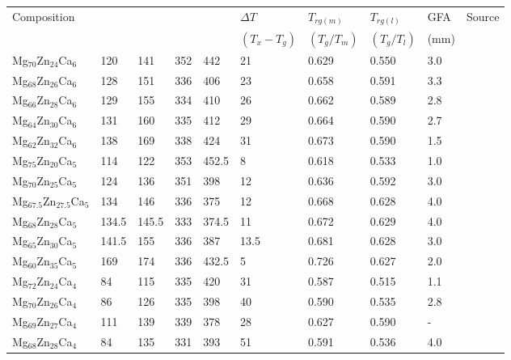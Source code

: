 \documentclass[draft,a4paper,12pt,oneside]{report}%
\begin{document}
\begin{table}[h]
	\centering
	\begin{tabular}{ l l l l l l l l l l }
		\toprule
		Composition & \Tg  & \Tx  & \Tm  & \Tl  & $\Delta T$ & $T_{rg(m)}$ & $T_{rg(l)}$ & GFA & Source \\ 
		& & & & & $(T_{x} - T_{g})$ & $(T_{g}/T_{m})$ & $(T_{g}/T_{l})$ & (mm) & \\ 
		\midrule
		Mg$_{70}$Zn$_{24}$Ca$_{6}$ & 120 & 141 & 352 & 442 & 21 & 0.629 & 0.550 & 3.0 & \cite{Cao2013, Cao2012} \\ 
		Mg$_{68}$Zn$_{26}$Ca$_{6}$ & 128 & 151 & 336 & 406 & 23 & 0.658 & 0.591 & 3.3 & \cite{Cao2013, Cao2012} \\ 
		Mg$_{66}$Zn$_{28}$Ca$_{6}$ & 129 & 155 & 334 & 410 & 26 & 0.662 & 0.589 & 2.8 & \cite{Cao2013, Cao2012} \\ 
		Mg$_{64}$Zn$_{30}$Ca$_{6}$ & 131 & 160 & 335 & 412 & 29 & 0.664 & 0.590 & 2.7 & \cite{Cao2013, Cao2012} \\ 
		Mg$_{62}$Zn$_{32}$Ca$_{6}$ & 138 & 169 & 338 & 424 & 31 & 0.673 & 0.590 & 1.5 & \cite{Cao2013, Cao2012} \\ 
		Mg$_{75}$Zn$_{20}$Ca$_{5}$ & 114 & 122 & 353 & 452.5 & 8 & 0.618 & 0.533 & 1.0 & \cite{Gu2005} \\ 
		Mg$_{70}$Zn$_{25}$Ca$_{5}$ & 124 & 136 & 351 & 398 & 12 & 0.636 & 0.592 & 3.0 & \cite{Gu2005, Zhou2013} \\ 
		Mg$_{67.5}$Zn$_{27.5}$Ca$_{5}$ & 134 & 146 & 336 & 375 & 12 & 0.668 & 0.628 & 4.0 & \cite{Gu2005} \\ 
		Mg$_{68}$Zn$_{28}$Ca$_{5}$ & 134.5 & 145.5 & 333 & 374.5 & 11 & 0.672 & 0.629 & 4.0 & \cite{Gu2005} \\ 
		Mg$_{65}$Zn$_{30}$Ca$_{5}$ & 141.5 & 155 & 336 & 387 & 13.5 & 0.681 & 0.628 & 3.0 & \cite{Gu2005} \\ 
		Mg$_{60}$Zn$_{35}$Ca$_{5}$ & 169 & 174 & 336 & 432.5 & 5 & 0.726 & 0.627 & 2.0 & \cite{Gu2005} \\ 
		Mg$_{72}$Zn$_{24}$Ca$_{4}$ & 84 & 115 & 335 & 420 & 31 & 0.587 & 0.515 & 1.1 & \cite{Cao2013, Cao2012} \\ 
		Mg$_{70}$Zn$_{26}$Ca$_{4}$ & 86 & 126 & 335 & 398 & 40 & 0.590 & 0.535 & 2.8 & \cite{Cao2013, Cao2012} \\ 
		Mg$_{69}$Zn$_{27}$Ca$_{4}$ & 111 & 139 & 339 & 378 & 28 & 0.627 & 0.590 & - & \cite{Wang2013} \\ 
		Mg$_{68}$Zn$_{28}$Ca$_{4}$ & 84 & 135 & 331 & 393 & 51 & 0.591 & 0.536 & 4.0 & \cite{Cao2013, Cao2012} \\ 

\end{tabular}
\end{table}
\end{document}
